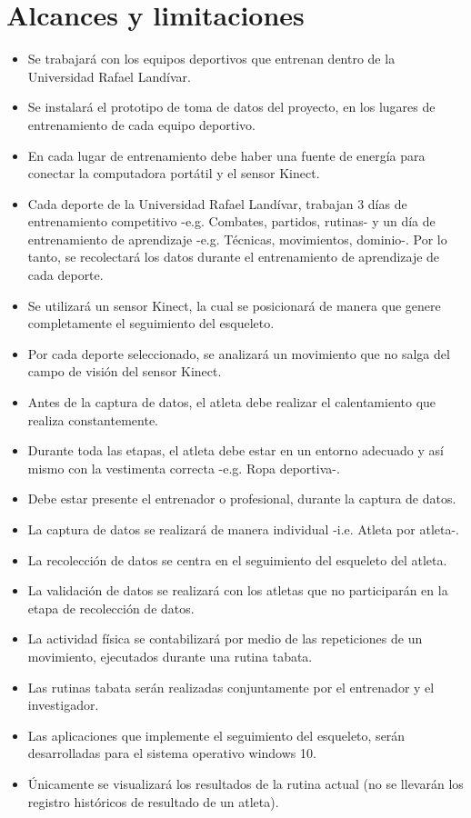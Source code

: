 \section{Alcances y limitaciones}
\begin{itemize}
\item Se trabajar\'a con los equipos deportivos que entrenan dentro de la Universidad Rafael Land\'ivar.
\item Se instalar\'a el prototipo de toma de datos del proyecto, en los lugares de entrenamiento de cada equipo deportivo.
\item En cada lugar de entrenamiento debe haber una fuente de energ\'ia para conectar la computadora port\'atil y el sensor Kinect.
\item Cada deporte de la Universidad Rafael Land\'ivar, trabajan  3 d\'ias de entrenamiento competitivo -e.g. Combates, partidos, rutinas- y un d\'ia de entrenamiento de aprendizaje -e.g. T\'ecnicas, movimientos, dominio-. Por lo tanto, se recolectar\'a los datos durante el entrenamiento de aprendizaje de cada deporte.
\item Se utilizar\'a un sensor Kinect, la cual se posicionar\'a de manera que genere completamente el seguimiento del esqueleto.
\item Por cada deporte seleccionado, se analizar\'a un movimiento que no salga del campo de visi\'on del sensor Kinect.
\item Antes de la captura de datos, el atleta debe realizar el calentamiento que realiza constantemente.
\item Durante toda las etapas, el atleta debe estar en un entorno adecuado y as\'i mismo con la vestimenta correcta -e.g. Ropa deportiva-.
\item Debe estar presente el entrenador o profesional, durante la captura de datos.
\item  La captura de datos se realizar\'a de manera individual -i.e. Atleta por atleta-.
\item  La recolecci\'on de datos se centra en el seguimiento del esqueleto del atleta.
\item La validaci\'on de datos se realizar\'a con los atletas que no participar\'an en la etapa de recolecci\'on de datos.
\item La actividad f\'isica se contabilizar\'a por medio de las repeticiones de un  movimiento, ejecutados durante una rutina tabata.
\item Las rutinas tabata ser\'an realizadas conjuntamente por el entrenador y el investigador.
\item Las aplicaciones que implemente el seguimiento del esqueleto, ser\'an desarrolladas para el sistema operativo windows 10.
\item \'Unicamente se visualizar\'a los resultados de la rutina actual (no se llevar\'an los registro hist\'oricos de resultado de un atleta).
\end{itemize}